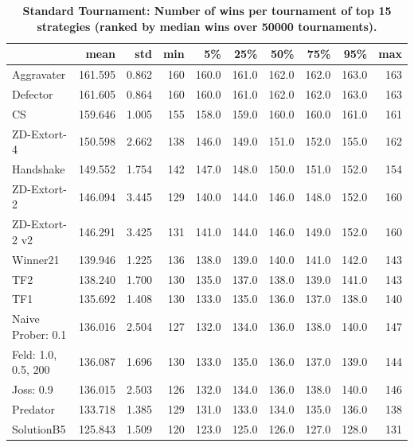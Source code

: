 \documentclass[10pt,letterpaper]{article}
\begin{document}
\begin{table}[!hbtp]
    \centering
        \caption{\bf Standard Tournament: Number of wins per tournament
        of top 15 strategies (ranked by median wins over
        50000 tournaments).}
        \label{tbl:standard_wins_top_winners}
\begin{tabular}{lrrrrrrrrr}
\toprule
{} &     mean &    std &  min &     5\% &    25\% &    50\% &    75\% &    95\% &  max \\
\midrule
Aggravater          &  161.595 &  0.862 &  160 &  160.0 &  161.0 &  162.0 &  162.0 &  163.0 &  163 \\
Defector            &  161.605 &  0.864 &  160 &  160.0 &  161.0 &  162.0 &  162.0 &  163.0 &  163 \\
CS                  &  159.646 &  1.005 &  155 &  158.0 &  159.0 &  160.0 &  160.0 &  161.0 &  161 \\
ZD-Extort-4         &  150.598 &  2.662 &  138 &  146.0 &  149.0 &  151.0 &  152.0 &  155.0 &  162 \\
Handshake           &  149.552 &  1.754 &  142 &  147.0 &  148.0 &  150.0 &  151.0 &  152.0 &  154 \\
ZD-Extort-2         &  146.094 &  3.445 &  129 &  140.0 &  144.0 &  146.0 &  148.0 &  152.0 &  160 \\
ZD-Extort-2 v2      &  146.291 &  3.425 &  131 &  141.0 &  144.0 &  146.0 &  149.0 &  152.0 &  160 \\
Winner21            &  139.946 &  1.225 &  136 &  138.0 &  139.0 &  140.0 &  141.0 &  142.0 &  143 \\
TF2                 &  138.240 &  1.700 &  130 &  135.0 &  137.0 &  138.0 &  139.0 &  141.0 &  143 \\
TF1                 &  135.692 &  1.408 &  130 &  133.0 &  135.0 &  136.0 &  137.0 &  138.0 &  140 \\
Naive Prober: 0.1   &  136.016 &  2.504 &  127 &  132.0 &  134.0 &  136.0 &  138.0 &  140.0 &  147 \\
Feld: 1.0, 0.5, 200 &  136.087 &  1.696 &  130 &  133.0 &  135.0 &  136.0 &  137.0 &  139.0 &  144 \\
Joss: 0.9           &  136.015 &  2.503 &  126 &  132.0 &  134.0 &  136.0 &  138.0 &  140.0 &  146 \\
Predator            &  133.718 &  1.385 &  129 &  131.0 &  133.0 &  134.0 &  135.0 &  136.0 &  138 \\
SolutionB5          &  125.843 &  1.509 &  120 &  123.0 &  125.0 &  126.0 &  127.0 &  128.0 &  131 \\
\bottomrule
\end{tabular}
\end{table}
\end{document}
